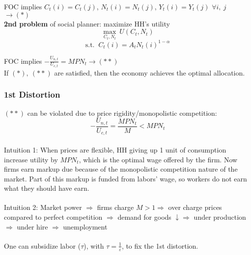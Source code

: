 \documentclass{article}
\begin{document}
FOC implies $C_t(i) = C_t(j)$, $N_t(i) = N_t(j)$, $Y_t(i) = Y_t(j)$ $\forall i,\ j$ $\longrightarrow (*)$ \\

\textbf{2nd problem} of social planner: maximize HH's utility
$$\max_{C_t, N_t}\ U(C_t, N_t)$$
$$\text{s.t. }\ C_t(i) = A_t N_t(i)^{1-\alpha}$$

FOC implies $-\frac{U_{n,t}}{U_{c,t}} = MPN_t \longrightarrow (**)$\\

If $(*),\ (**)$ are satisfied, then the economy achieves the optimal allocation.\\

\subsubsection{1st Distortion}
$(**)$ can be violated due to price rigidity/monopolistic competition: 
$$-\frac{U_{n,t}}{U_{c,t}} = \frac{MPN_t}{M} < MPN_t$$
\\
{\color{ForestGreen}Intuition 1: When prices are flexible, HH giving up 1 unit of consumption increase utility by $MPN_t$, which is the optimal wage offered by the firm. Now firms earn markup due because of the monopolistic competition nature of the market. Part of this markup is funded from labors' wage, so workers do not earn what they should have earn.}\\
\\
{\color{ForestGreen}Intuition 2: Market power $\Rightarrow$ firms charge $M>1 \Rightarrow$ over charge prices compared to perfect competition $\Rightarrow$ demand for goods $\downarrow \Rightarrow$ under production $\Rightarrow$ under hire $\Rightarrow$ unemployment}\\
\\
One can subsidize labor ($\tau$), with $\tau = \frac{1}{\varepsilon}$, to fix the 1st distortion.
\end{document}
